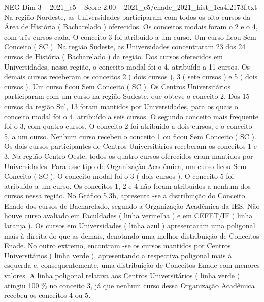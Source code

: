\begin{textsample}{NEG Dim 3 – 2021\_c5 – Score 2.00 – 2021\_c5/enade\_2021\_hist\_1ca4f2173f.txt}
Na região Nordeste, as Universidades participaram com todos os oito cursos da Área de História ( Bacharelado ) oferecidos.
Os conceitos modais foram o 2 e o 4, com três cursos cada.
O conceito 3 foi atribuído a um curso.
Um curso ficou Sem Conceito ( SC ).
Na região Sudeste, as Universidades concentraram 23 dos 24 cursos de História ( Bacharelado ) da região.
Dos cursos oferecidos em Universidades, nessa região, o conceito modal foi o 4, atribuído a 11 cursos.
Os demais cursos receberam os conceitos 2 ( dois cursos ), 3 ( sete cursos ) e 5 ( dois cursos ).
Um curso ficou Sem Conceito ( SC ).
Os Centros Universitários participaram com um curso na região Sudeste, que obteve o conceito 2.
Dos 15 cursos da região Sul, 13 foram mantidos por Universidades, para os quais o conceito modal foi o 4, atribuído a seis cursos.
O segundo conceito mais frequente foi o 3, com quatro cursos.
O conceito 2 foi atribuído a dois cursos, e o conceito 5, a um curso.
Nenhum curso recebeu o conceito 1 ou ficou Sem Conceito ( SC ).
Os dois cursos participantes de Centros Universitários receberam os conceitos 1 e 3.
Na região Centro-Oeste, todos os quatro cursos oferecidos eram mantidos por Universidades.
Para esse tipo de Organização Acadêmica, um curso ficou Sem Conceito ( SC ).
O conceito modal foi o 3 ( dois cursos ).
O conceito 5 foi atribuído a um curso.
Os conceitos 1, 2 e 4 não foram atribuídos a nenhum dos cursos nessa região.
No Gráfico 5.3b, apresenta -se a distribuição do Conceito Enade dos cursos de Bacharelado, segundo a Organização Acadêmica da IES.
Não houve curso avaliado em Faculdades ( linha vermelha ) e em CEFET/IF ( linha laranja ).
Os cursos em Universidades ( linha azul ) apresentaram uma poligonal mais à direita do que as demais, denotando uma melhor distribuição de Conceitos Enade.
No outro extremo, encontram -se os cursos mantidos por Centros Universitários ( linha verde ), apresentando a respectiva poligonal mais à esquerda e, consequentemente, uma distribuição de Conceitos Enade com menores valores.
A linha poligonal relativa aos Centros Universitários ( linha verde ) atingiu 100 \% no conceito 3, já que nenhum curso dessa Organização Acadêmica recebeu os conceitos 4 ou 5.

\end{textsample}
